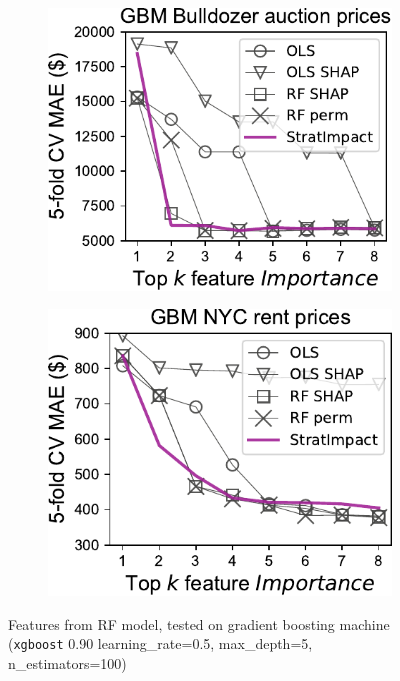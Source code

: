 \documentclass[11pt]{article}
\begin{document}
\begin{figure}
\begin{subfigure}{.245\textwidth}
    \centering
\includegraphics[scale=0.45]{images/bulldozer-topk-GBM-Importance.pdf}
\end{subfigure}%
\hfill
\begin{subfigure}{.245\textwidth}
    \centering
\includegraphics[scale=0.45]{images/rent-topk-GBM-Importance.pdf}
\end{subfigure}
\caption[short]{\small Features from RF model, tested on gradient boosting machine ({\tt xgboost} 0.90 learning\_rate=0.5,  max\_depth=5,  n\_estimators=100)}
\label{fig:topk-gbm}
\end{figure}
\end{document}
